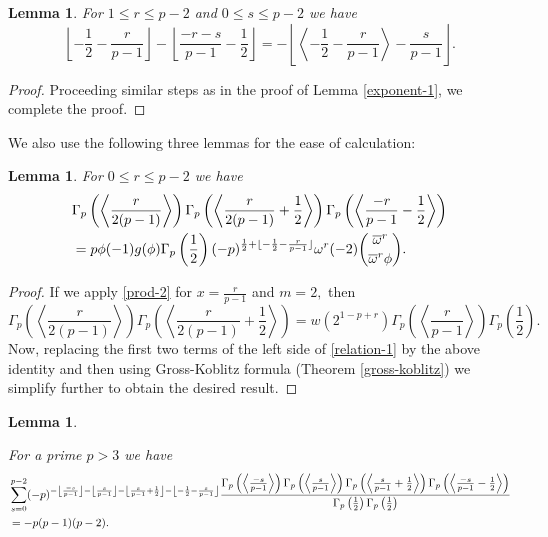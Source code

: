 \documentclass[12pt]{amsart}
\theoremstyle{plain}
\newtheorem{lemma}[theorem]{Lemma}
\theoremstyle{definition}
\theoremstyle{remark}
\numberwithin{equation}{section}
\begin{document}
\begin{lemma}\label{exponent-3}
For $1\leq r \leq p-2$ and $0\leq s \leq p-2$ we have $$\left\lfloor-\frac{1}{2}-\frac{r}{p-1}\right\rfloor-\left\lfloor\frac{-r-s}{p-1}-\frac{1}{2}\right\rfloor=-\left\lfloor\left\langle-\frac{1}{2}-\frac{r}{p-1}\right\rangle-\frac{s}{p-1}\right\rfloor.$$
\end{lemma}

\begin{proof}
Proceeding similar steps as in the proof of Lemma \ref{exponent-1}, we complete the proof.
\end{proof}
		
We also use the following three lemmas for the ease of calculation:

\begin{lemma}
For $0\leq r\leq p-2$ we have 
\begin{align}\label{relation-1}
    &\Gamma_p\left(\left\langle\frac{r}{2(p-1)}\right\rangle\right)\Gamma_p\left(\left\langle\frac{r}{2(p-1)}+\frac{1}{2}\right\rangle\right) \Gamma_p\left(\left\langle\frac{-r}{p-1} -\frac{1}{2}\right\rangle\right)\notag\\
    &=p\phi(-1)g(\phi)\Gamma_p\left(\frac{1}{2}\right)(-p)^{\frac{1}{2}+\lfloor-\frac{1}{2}-\frac{r}{p-1}\rfloor}{\omega}^r(-2)\binom{\overline{\omega}^r}{\overline{\omega}^r\phi}.
\end{align}
\end{lemma}	

\begin{proof}	
If we apply \eqref{prod-2} for $x=\frac{r}{p-1}$ and $m=2,$ then $$\Gamma_p\left(\left<\frac{r}{2(p-1)}\right>\right)\Gamma_p\left(\left<\frac{r}{2(p-1)}+\frac{1}{2}\right>\right)=w(2^{1-p+r})\Gamma_p\left(\left<\frac{r}{p-1}\right>\right)\Gamma_p\left(\frac{1}{2}\right).$$ Now, replacing the first two terms of the left side of \eqref{relation-1} by the above identity and then using Gross-Koblitz formula (Theorem \ref{gross-koblitz}) we simplify further to obtain the desired result.
\end{proof}

\begin{lemma}\label{relation-2}

For a prime $p>3$ we have 
\begin{align}
&\sum_{s=0}^{p-2}(-p)^{-\left\lfloor\frac{-s}{p-1}\right\rfloor-\left\lfloor\frac{s}{p-1}\right\rfloor-\left\lfloor\frac{s}{p-1}+\frac{1}{2}\right\rfloor-\left\lfloor-\frac{1}{2}-\frac{s}{p-1}\right\rfloor}\frac{\Gamma_p\left(\left\langle\frac{-s}{p-1}\right\rangle\right)\Gamma_p\left(\left\langle\frac{s}{p-1}\right\rangle\right)\Gamma_p\left(\left\langle\frac{s}{p-1}+\frac{1}{2}\right\rangle\right)\Gamma_p\left(\left\langle\frac{-s}{p-1}-\frac{1}{2}\right\rangle\right)}{\Gamma_p\left(\frac{1}{2}\right) \Gamma_p\left(\frac{1}{2}\right)}\notag\\
&=-p(p-1)(p-2).\notag
\end{align}
\end{lemma}
\end{document}
